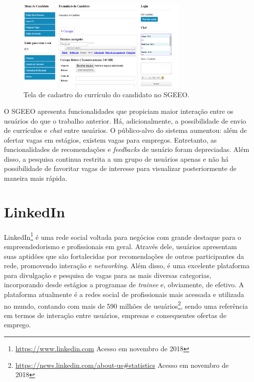 \begin{figure}[H]
    \caption{Tela de cadastro do currículo do candidato no SGEEO.}
       	\begin{center}
            \includegraphics[width=0.75\textwidth]{figuras/rel02.png}
        \end{center}
    \label{telaCandidatoSGEEO}
\end{figure}

O SGEEO apresenta funcionalidades que propiciam maior interação entre os usuários do que o trabalho anterior. Há, adicionalmente, a possibilidade de envio de currículos e \textit{chat} entre usuários. O público-alvo do sistema aumentou: além de ofertar vagas em estágios, existem vagas para empregos. Entretanto, as funcionalidades de recomendações e \textit{feedbacks} de usuário foram depreciadas. Além disso, a pesquisa continua restrita a um grupo de usuários apenas e não há possibilidade de favoritar vagas de interesse para visualizar posteriormente de maneira mais rápida.

\section{LinkedIn}
\label{trabRelLinkedin}

LinkedIn\footnote{{\url{https://www.linkedin.com} Acesso em novembro de 2018}} é uma rede social voltada para negócios com grande destaque para o empreendedorismo e profissionais em geral. Através dele, usuários apresentam suas aptidões que são fortalecidas por recomendações de outros participantes da rede, promovendo interação e \textit{networking}. Além disso, é uma excelente plataforma para divulgação e pesquisa de vagas para as mais diversas categorias, incorporando desde estágios a programas de \textit{trainee} e, obviamente, de efetivo. A plataforma atualmente é a redes social de profissionais mais acessada e utilizada no mundo, contando com mais de 590 milhões de usuários\footnote{{\url{https://news.linkedin.com/about-us\#statistics} Acesso em novembro de 2018}}, sendo uma referência em termos de interação entre usuários, empresas e consequentes ofertas de emprego.


